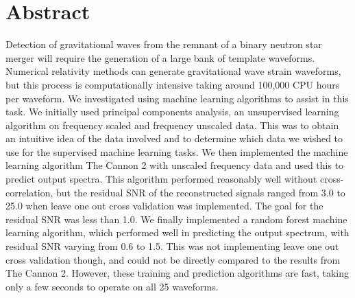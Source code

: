 

\section*{Abstract} %

	\color{black}
Detection of gravitational waves from the remnant of a binary neutron star merger will require the generation of a large bank of template waveforms. Numerical relativity methods can generate gravitational wave strain waveforms, but this process is computationally intensive taking around 100,000 CPU hours per waveform. We investigated using machine learning algorithms to assist in this task. We initially used principal components analysis, an unsupervised learning algorithm on frequency scaled and frequency unscaled data. This was to obtain an intuitive idea of the data involved and to determine which data we wished to use for the supervised machine learning tasks. We then implemented the  machine learning algorithm The Cannon 2 with unscaled frequency data and used this to predict output spectra. This algorithm performed reasonably well without cross-correlation, but the residual SNR of the reconstructed signals ranged from 3.0 to 25.0 when leave one out cross validation was implemented. The goal for the residual SNR was less than 1.0. We finally implemented a random forest machine learning algorithm, which performed well in predicting the output spectrum, with residual SNR varying from 0.6 to 1.5. This was not implementing leave one out cross validation though, and could not be directly compared to the results from The Cannon 2. However, these training and prediction algorithms are fast, taking only a few seconds to operate on all 25 waveforms.

	\pagebreak